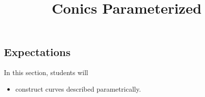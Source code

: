 \documentclass{ximera}
\title{Conics Parameterized}
\begin{document}
\begin{abstract}
%
\end{abstract}
\maketitle











\subsection{Expectations}

\begin{sectionOutcomes}
In this section, students will 

\begin{itemize}
\item construct curves described parametrically.

\end{itemize}
\end{sectionOutcomes}
\end{document}
